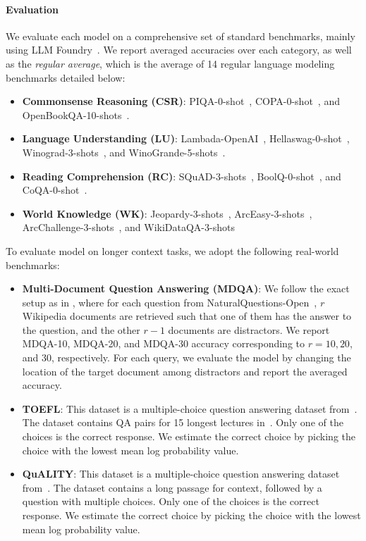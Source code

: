 \paragraph{Evaluation} We evaluate each model on a comprehensive set of standard benchmarks, mainly using LLM Foundry~\citep{foundry}. We report averaged accuracies over each category, as well as the \emph{regular average}, which is the average of 14 regular language modeling benchmarks detailed below:
\begin{itemize}[wide, labelindent=5pt, noitemsep]
\item {\bf Commonsense Reasoning (CSR)}: PIQA-0-shot~\citep{piqa}, COPA-0-shot~\citep{copa}, and OpenBookQA-10-shots~\citep{openbookqa}.
\item {\bf Language Understanding (LU)}: Lambada-OpenAI~\citep{paperno2016lambada}, Hellaswag-0-shot~\citep{zellers2019hellaswag}, Winograd-3-shots~\citep{levesque2012winograd}, and WinoGrande-5-shots~\citep{sakaguchi2021winogrande}.
\item {\bf Reading Comprehension (RC)}: SQuAD-3-shots~\citep{rajpurkar2018know}, BoolQ-0-shot~\citep{clark2019boolq}, and CoQA-0-shot~\citep{reddy2019coqa}.
\item {\bf World Knowledge (WK)}: Jeopardy-3-shots~\citep{jeopardy}, ArcEasy-3-shots~\citep{clark2018think}, ArcChallenge-3-shots~\citep{clark2018think}, and WikiDataQA-3-shots~\citep{qa_wikidata}
\end{itemize}
To evaluate model on longer context tasks, we adopt the following real-world benchmarks: 
\begin{itemize}[wide, labelindent=5pt, noitemsep]
\item {\bf Multi-Document Question Answering (MDQA)}: We follow the exact setup as in \citet{liu2024lost}, where for each question from NaturalQuestions-Open~\citep{lee2019latent,kwiatkowski2019natural}, $r$ Wikipedia documents are retrieved such that one of them has the answer to the question, and the other $r-1$ documents are distractors. We report MDQA-10, MDQA-20, and MDQA-30 accuracy corresponding to $r=10, 20$, and 30, respectively. For each query, we evaluate the model by changing the location of the target document among distractors and report the averaged accuracy.
\item {\bf TOEFL}: This dataset is a multiple-choice question answering dataset from~\citet{an2023leval}. The dataset contains QA pairs for 15 longest lectures in~\citet{tseng2016machine, chung-etal-2018-supervised}. Only one of the choices is the correct response. We estimate the correct choice by picking the choice with the lowest mean log probability value.
\item {\bf QuALITY}: This dataset is a multiple-choice question answering dataset from~\citet{an2023leval}. The dataset contains a long passage for context, followed by a question with multiple choices. Only one of the choices is the correct response. We estimate the correct choice by picking the choice with the lowest mean log probability value. 
\end{itemize}

